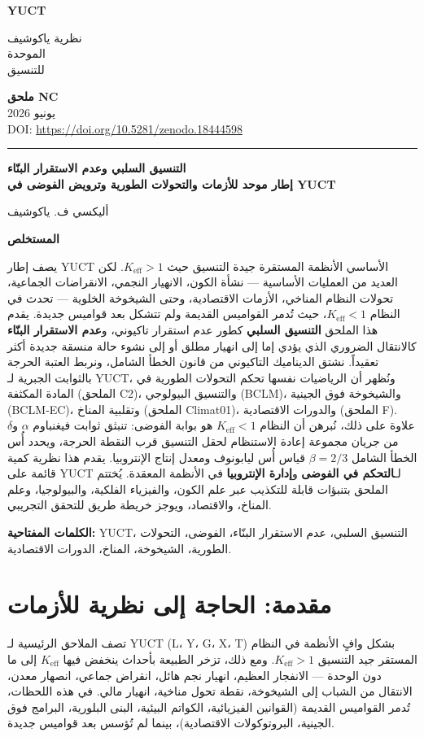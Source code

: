 \documentclass[12pt,a4paper]{article}
\newcommand{\Keff}{K_{\mathrm{eff}}}
\newcommand{\makeheader}{%
	\noindent
	\begin{minipage}{0.17\textwidth}
		\raggedright
		{\sffamily\bfseries\color{skyblue}\fontsize{46}{46}\selectfont YUCT}%
	\end{minipage}%
	\hspace{30pt}
	\begin{minipage}{0.32\textwidth}
		\raggedright
		{\sffamily\fontsize{11}{13}\selectfont نظرية ياكوشيف\\ الموحدة\\ للتنسيق}%
	\end{minipage}%
	\hfill
	\begin{minipage}{0.38\textwidth}
		\raggedleft
		{\sffamily\bfseries ملحق NC}\\
		{\sffamily يونيو 2026}\\
		{\sffamily\footnotesize \scriptsize DOI: \url{https://doi.org/10.5281/zenodo.18444598}}%
	\end{minipage}
	\par\vspace{5pt}
	\noindent\textcolor{gold}{\rule{\textwidth}{1.6pt}}
	\par\vspace{0pt}
}
\begin{document}
	\thispagestyle{firstpage}
	\makeheader
	
	\vspace{0cm}
	{\LARGE\bfseries التنسيق السلبي وعدم الاستقرار البنّاء \\
		\Large إطار موحد للأزمات والتحولات الطورية وترويض الفوضى في YUCT \par}
	\vspace{0.2cm}
	
	{\large أليكسي ف. ياكوشيف} \\
	\vspace{0.0cm}
	
	{\color{darkblue}\textbf{\LARGE المستخلص}} \par
	{\large
		\noindent
		يصف إطار YUCT الأساسي الأنظمة المستقرة جيدة التنسيق حيث \(\Keff > 1\). لكن العديد من العمليات الأساسية — نشأة الكون، الانهيار النجمي، الانقراضات الجماعية، تحولات النظام المناخي، الأزمات الاقتصادية، وحتى الشيخوخة الخلوية — تحدث في النظام \(\Keff < 1\)، حيث تُدمر القواميس القديمة ولم تتشكل بعد قواميس جديدة. يقدم هذا الملحق \textbf{التنسيق السلبي} كطور عدم استقرار تاكيوني، و\textbf{عدم الاستقرار البنّاء} كالانتقال الضروري الذي يؤدي إما إلى انهيار مطلق أو إلى نشوء حالة منسقة جديدة أكثر تعقيداً. نشتق الديناميك التاكيوني من قانون الخطأ الشامل، ونربط العتبة الحرجة بالثوابت الجبرية لـ YUCT، ونُظهر أن الرياضيات نفسها تحكم التحولات الطورية في المادة المكثفة (الملحق C2)، والتنسيق البيولوجي (BCLM)، والشيخوخة فوق الجينية (BCLM‑EC)، وتقلبية المناخ (الملحق Climat01)، والدورات الاقتصادية (الملحق F). علاوة على ذلك، نُبرهن أن النظام \(\Keff < 1\) هو بوابة الفوضى: تنبثق ثوابت فيغنباوم \(\alpha\) و\(\delta\) من جريان مجموعة إعادة الاستنظام لحقل التنسيق قرب النقطة الحرجة، ويحدد أُس الخطأ الشامل \(\beta = 2/3\) قياس أُس ليابونوف ومعدل إنتاج الإنتروبيا. يقدم هذا نظرية كمية قائمة على YUCT لـ\textbf{التحكم في الفوضى} و\textbf{إدارة الإنتروبيا} في الأنظمة المعقدة. يُختتم الملحق بتنبؤات قابلة للتكذيب عبر علم الكون، والفيزياء الفلكية، والبيولوجيا، وعلم المناخ، والاقتصاد، ويوجز خريطة طريق للتحقق التجريبي.
	}
	
	\vspace{0.1cm}
	\noindent
	{\color{darkblue}\textbf{الكلمات المفتاحية:}} YUCT، التنسيق السلبي، عدم الاستقرار البنّاء، الفوضى، التحولات الطورية، الشيخوخة، المناخ، الدورات الاقتصادية.
	
	\tableofcontents
	\newpage
	
	\section{مقدمة: الحاجة إلى نظرية للأزمات}
	تصف الملاحق الرئيسية لـ YUCT (L، Y، G، X، T) بشكل وافٍ الأنظمة في النظام المستقر جيد التنسيق \(\Keff > 1\). ومع ذلك، تزخر الطبيعة بأحداث ينخفض فيها \(\Keff\) إلى ما دون الوحدة — الانفجار العظيم، انهيار نجم هائل، انقراض جماعي، انصهار معدن، الانتقال من الشباب إلى الشيخوخة، نقطة تحول مناخية، انهيار مالي. في هذه اللحظات، تُدمر القواميس القديمة (القوانين الفيزيائية، الكواتم البيئية، البنى البلورية، البرامج فوق الجينية، البروتوكولات الاقتصادية)، بينما لم تُؤسس بعد قواميس جديدة.
	
\end{document}
